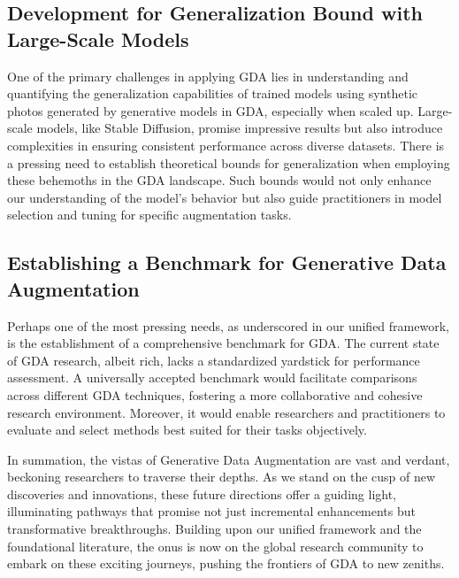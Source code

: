 \documentclass[preprint,12pt,authoryear]{elsarticle}
\begin{document}
\subsection{Development for Generalization Bound with Large-Scale Models}
One of the primary challenges in applying GDA lies in understanding and quantifying the generalization capabilities of trained models using synthetic photos generated by generative models in GDA, especially when scaled up. Large-scale models, like Stable Diffusion, promise impressive results but also introduce complexities in ensuring consistent performance across diverse datasets. There is a pressing need to establish theoretical bounds for generalization when employing these behemoths in the GDA landscape. Such bounds would not only enhance our understanding of the model's behavior but also guide practitioners in model selection and tuning for specific augmentation tasks.



\subsection{Establishing a Benchmark for Generative Data Augmentation}
Perhaps one of the most pressing needs, as underscored in our unified framework, is the establishment of a comprehensive benchmark for GDA. The current state of GDA research, albeit rich, lacks a standardized yardstick for performance assessment. A universally accepted benchmark would facilitate comparisons across different GDA techniques, fostering a more collaborative and cohesive research environment. Moreover, it would enable researchers and practitioners to evaluate and select methods best suited for their tasks objectively.

In summation, the vistas of Generative Data Augmentation are vast and verdant, beckoning researchers to traverse their depths. As we stand on the cusp of new discoveries and innovations, these future directions offer a guiding light, illuminating pathways that promise not just incremental enhancements but transformative breakthroughs. Building upon our unified framework and the foundational literature, the onus is now on the global research community to embark on these exciting journeys, pushing the frontiers of GDA to new zeniths.
\end{document}
